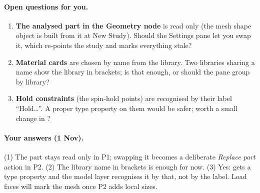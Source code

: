 \paragraph{Open questions for you.}
\begin{enumerate}[nosep]
  \item \textbf{The analysed part in the Geometry node} is read only (the mesh shape object is built from it at New
        Study). Should the Settings pane let you swap it, which re-points the study and marks everything stale?
  \item \textbf{Material cards} are chosen by name from the library. Two libraries sharing a name show the library in
        brackets; is that enough, or should the pane group by library?
  \item \textbf{Hold constraints} (the spin-hold points) are recognised by their label ``Hold\ldots''. A proper type
        property on them would be safer; worth a small change in ?
\end{enumerate}

\paragraph{Your answers (1 Nov).} (1) The part stays read only in P1; swapping it becomes a deliberate \emph{Replace part}
action in P2. (2) The library name in brackets is enough for now. (3) Yes:  gets a type property and
the model layer recognises it by that, not by the label. Load faces will mark the mesh once P2 adds local sizes.
